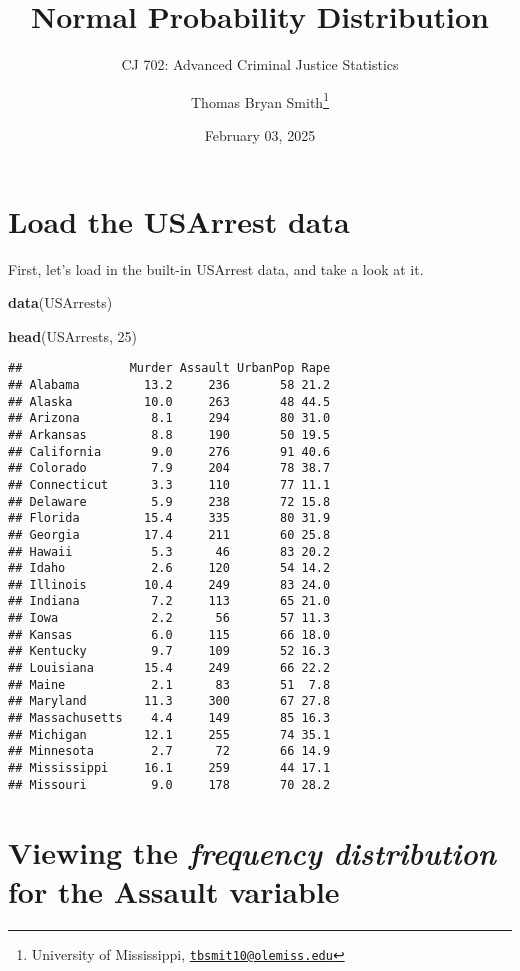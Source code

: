 \documentclass[
]{article}
\title{Normal Probability Distribution}
\subtitle{CJ 702: Advanced Criminal Justice Statistics}
\author{Thomas Bryan Smith\footnote{University of Mississippi,
  \href{mailto:tbsmit10@olemiss.edu}{\nolinkurl{tbsmit10@olemiss.edu}}}}
\date{February 03, 2025}
\newenvironment{Shaded}{\begin{snugshade}}{\end{snugshade}}
\newcommand{\DecValTok}[1]{\textcolor[rgb]{0.00,0.00,0.81}{#1}}
\newcommand{\FunctionTok}[1]{\textcolor[rgb]{0.13,0.29,0.53}{\textbf{#1}}}
\newcommand{\NormalTok}[1]{#1}
\begin{document}
\maketitle

{
\hypersetup{linkcolor=}
\setcounter{tocdepth}{2}
\tableofcontents
}
\section{Load the USArrest data}\label{load-the-usarrest-data}

First, let's load in the built-in USArrest data, and take a look at it.

\begin{Shaded}
\begin{Highlighting}[]
\FunctionTok{data}\NormalTok{(USArrests)}

\FunctionTok{head}\NormalTok{(USArrests, }\DecValTok{25}\NormalTok{)}
\end{Highlighting}
\end{Shaded}

\begin{verbatim}
##               Murder Assault UrbanPop Rape
## Alabama         13.2     236       58 21.2
## Alaska          10.0     263       48 44.5
## Arizona          8.1     294       80 31.0
## Arkansas         8.8     190       50 19.5
## California       9.0     276       91 40.6
## Colorado         7.9     204       78 38.7
## Connecticut      3.3     110       77 11.1
## Delaware         5.9     238       72 15.8
## Florida         15.4     335       80 31.9
## Georgia         17.4     211       60 25.8
## Hawaii           5.3      46       83 20.2
## Idaho            2.6     120       54 14.2
## Illinois        10.4     249       83 24.0
## Indiana          7.2     113       65 21.0
## Iowa             2.2      56       57 11.3
## Kansas           6.0     115       66 18.0
## Kentucky         9.7     109       52 16.3
## Louisiana       15.4     249       66 22.2
## Maine            2.1      83       51  7.8
## Maryland        11.3     300       67 27.8
## Massachusetts    4.4     149       85 16.3
## Michigan        12.1     255       74 35.1
## Minnesota        2.7      72       66 14.9
## Mississippi     16.1     259       44 17.1
## Missouri         9.0     178       70 28.2
\end{verbatim}

\section{\texorpdfstring{Viewing the \emph{frequency distribution} for
the \textbf{Assault}
variable}{Viewing the frequency distribution for the Assault variable}}\label{viewing-the-frequency-distribution-for-the-assault-variable}
\end{document}

